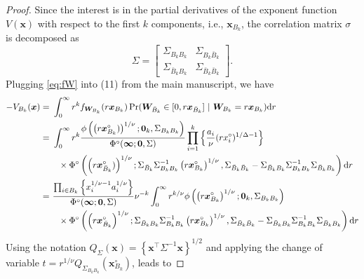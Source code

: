 \documentclass[12pt]{article}
\begin{document}
\begin{proof}
Since the interest is in the partial derivatives of the exponent function $V(\bm x)$ with respect to the first $k$ components, i.e.,  $\bm x_{B_k}$, the correlation matrix $\sigma$ is decomposed as
$$\Sigma = \begin{bmatrix}
 \Sigma_{B_k B_k} &  \Sigma_{B_k \bar{B}_k} \\
  \Sigma_{\bar{B}_k B_k} &  \Sigma_{\bar{B}_k \bar{B}_k}	
 \end{bmatrix}.
$$
Plugging \eqref{eq:fW} into (11) from the main manuscript, we have
%
\begin{align*}
 -V_{B_k}(\bm x) =&\ \int_0^\infty r^k f_{\bm W_{B_k}}(r \bm x_{B_k})  \Pr(\bm W_{\bar{B}_k} \in [0, r \bm x_{\bar{B}_k} ]\ | \ \bm W_{B_k} = r \bm x_{B_k} )\text dr \\
=&\ \int_0^\infty r^k \frac{\phi\left( \left( r \bm x_{B_k}^\circ) \right)^{1/\nu}; \bm 0_{k}, \Sigma_{B_k B_k}\right)}{\Phi^\circ(\bm \infty;\bm 0, \Sigma)} 
\prod_{i=1}^k \left\{ \frac{a_i}{\nu}(r x_i^\circ)^{1/\Delta-1} \right\} \\
&\quad \times \Phi^\circ \left( \left(r \bm x_{\bar{B}_k}^\circ)\right)^{1/\nu};
\Sigma_{\bar{B}_k}\Sigma_{B_k B_k}^{-1} \left(r \bm x_{B_k}^\circ\right)^{1/\nu},\Sigma_{\bar{B}_k\bar{B}_k}-\Sigma_{\bar{B}_k B_k}\Sigma_{B_k B_k}^{-1}\Sigma_{\bar{B}_k B_k} \right)  \text dr \\
=&\ \frac{\prod_{i\in B_k} \left\{ x_i^{1/\nu-1}a_i^{1/\nu}\right\}}{\Phi^\circ(\bm \infty;\bm 0, \Sigma)} \nu^{-k} \int_0^\infty r^{k/\nu} \phi\left( \left( r \bm x_{B_k}^\circ\right)^{1/\nu}; \bm 0_k, \Sigma_{B_k B_k}\right) \\
&\quad \times \Phi^\circ \left( \left(r \bm x_{\bar{B}_k}^\circ \right)^{1/\nu};
\Sigma_{\bar{B}_k B_k}\Sigma_{B_k B_k}^{-1} \left(r \bm x_{B_k}^\circ\right)^{1/\nu},\Sigma_{\bar{B}_k \bar{B}_k}-\Sigma_{\bar{B}_k B_k}\Sigma_{B_k B_k}^{-1}\Sigma_{\bar{B}_k B_k}\right) \text dr\\
\end{align*} 
%
Using the notation $Q_\Sigma \left( \bm x \right) = \left\{ \bm x^\top \Sigma^{-1} \bm x\right\}^{1/2}$ and applying the change of variable $t=r^{1/\nu}Q_{\Sigma_{B_k B_k}}(\bm x_{B_k}^\circ)$, leads to 


\end{proof}
\end{document}

